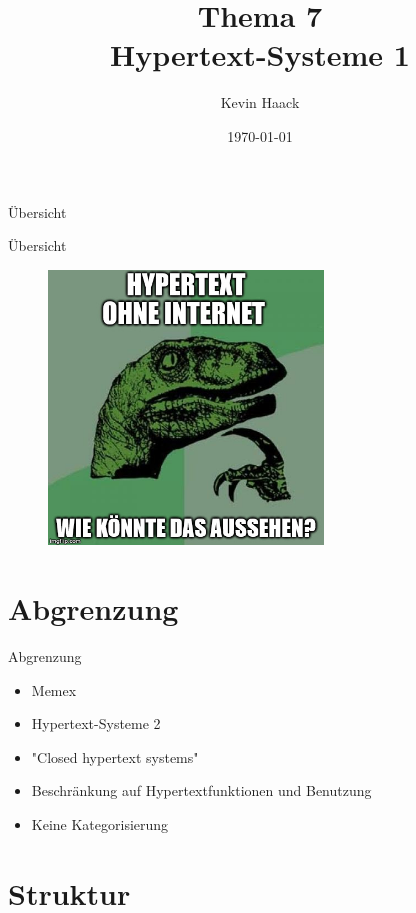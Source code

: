 \documentclass{beamer}
\title{Thema 7\\Hypertext-Systeme 1}
\author{Kevin Haack}
\institute{Universität Paderborn}
\date{\today}
\begin{document}
\begin{frame}
  \titlepage
\end{frame}

\begin{frame}{Übersicht}
\tableofcontents
\end{frame}

\begin{frame}{Übersicht}
	\begin{figure}[htbp]
		\centering
		\includegraphics[width=0.65\textwidth]{images/philosoraptor}
	\end{figure}
\end{frame}

\section{Abgrenzung}
\begin{frame}{Abgrenzung}
	\begin{itemize}
		\item Memex
		\item Hypertext-Systeme 2
		\item "Closed hypertext systems"
		\item Beschränkung auf Hypertextfunktionen und Benutzung
		\item Keine Kategorisierung
	\end{itemize}
\end{frame}



\section{Struktur}
\end{document}
